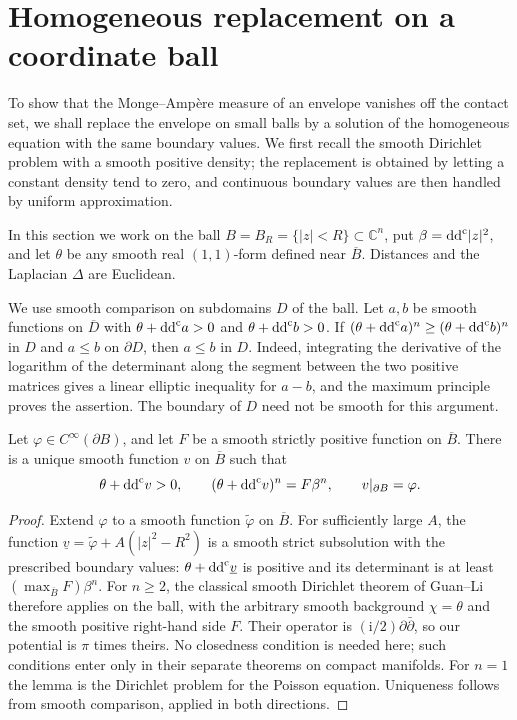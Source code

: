 \section{Homogeneous replacement on a coordinate ball}
\label{sec:local-homogeneous-dirichlet}

To show that the Monge--Amp\`ere measure of an envelope vanishes off the contact set, we shall replace the envelope on small balls by a solution of the homogeneous equation with the same boundary values. We first recall the smooth Dirichlet problem with a smooth positive density; the replacement is obtained by letting a constant density tend to zero, and continuous boundary values are then handled by uniform approximation.

In this section we work on the ball $B=B_R=\{|z|<R\}\subset\mathbb C^n$, put $\beta=\mathrm{dd}^{\mathrm{c}}|z|^2$, and let $\theta$ be any smooth real $(1,1)$-form defined near $\overline B$. Distances and the Laplacian $\Delta$ are Euclidean.

We use smooth comparison on subdomains $D$ of the ball. Let $a,b$ be smooth functions on $\overline D$ with $\theta+\mathrm{dd}^{\mathrm{c}} a>0$ and $\theta+\mathrm{dd}^{\mathrm{c}} b>0$. If $(\theta+\mathrm{dd}^{\mathrm{c}} a)^n\geq(\theta+\mathrm{dd}^{\mathrm{c}} b)^n$ in $D$ and $a\leq b$ on $\partial D$, then $a\leq b$ in $D$. Indeed, integrating the derivative of the logarithm of the determinant along the segment between the two positive matrices gives a linear elliptic inequality for $a-b$, and the maximum principle proves the assertion. The boundary of $D$ need not be smooth for this argument.

\begin{lemma}\label{lem:ball-smooth-dirichlet}
Let $\varphi\in C^\infty(\partial B)$, and let $F$ be a smooth strictly positive function on $\overline B$. There is a unique smooth function $v$ on $\overline B$ such that
\[
 \theta+\mathrm{dd}^{\mathrm{c}} v>0,\qquad
 (\theta+\mathrm{dd}^{\mathrm{c}} v)^n=F\beta^n,
 \qquad v|_{\partial B}=\varphi.
\]
\end{lemma}
\begin{proof}
Extend $\varphi$ to a smooth function $\widetilde\varphi$ on $\overline B$. For sufficiently large $A$, the function $\underline v=\widetilde\varphi+A(|z|^2-R^2)$ is a smooth strict subsolution with the prescribed boundary values: $\theta+\mathrm{dd}^{\mathrm{c}}\underline v$ is positive and its determinant is at least $(\max_{\overline B}F)\beta^n$. For $n\geq2$, the classical smooth Dirichlet theorem of Guan--Li therefore applies on the ball, with the arbitrary smooth background $\chi=\theta$ and the smooth positive right-hand side $F$. Their operator is $(\mathrm{i}/2)\partial\bar\partial$, so our potential is $\pi$ times theirs. No closedness condition is needed here; such conditions enter only in their separate theorems on compact manifolds. For $n=1$ the lemma is the Dirichlet problem for the Poisson equation. Uniqueness follows from smooth comparison, applied in both directions.
\end{proof}

